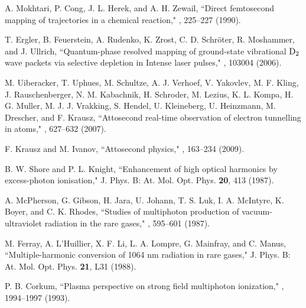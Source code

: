 \documentclass[10pt,letterpaper]{article}
\begin{document}

\begin{thebibliography}{99}
A. Mokhtari, P. Cong, J. L. Herek, and A. H. Zewail, ``Direct femtosecond mapping of trajectories in a chemical reaction," , 225--227 (1990).

T. Ergler, B. Feuerstein, A. Rudenko, K. Zrost, C. D. Schröter, R. Moshammer, and J. Ullrich, ``Quantum-phase resolved mapping of ground-state vibrational ${\rm{D}}_{2}$ wave packets via selective depletion in Intense laser pulses," , 103004 (2006).

M. Uiberacker, T. Uphues, M. Schultze, A. J. Verhoef, V. Yakovlev, M. F. Kling, J. Rauschenberger, N. M. Kabachnik, H. Schroder, M. Lezius, K. L. Kompa, H. G. Muller, M. J. J. Vrakking, S. Hendel, U. Kleineberg, U. Heinzmann, M. Drescher, and F. Krausz, ``Attosecond real-time observation of electron tunnelling in atoms," , 627--632 (2007).

F. Krausz and M. Ivanov, ``Attosecond physics," , 163--234 (2009).

B. W. Shore and P. L. Knight, ``Enhancement of high optical harmonics by excess-photon ionisation," J. Phys. B: At. Mol. Opt. Phys. {\bf 20}, 413 (1987).

A. McPherson, G. Gibson, H. Jara, U. Johann, T. S. Luk, I. A. McIntyre, K. Boyer, and C. K. Rhodes, ``Studies of multiphoton production of vacuum-ultraviolet radiation in the rare gases," , 595--601 (1987).

M. Ferray, A. L'Huillier, X. F. Li, L. A. Lompre, G. Mainfray, and C. Manus, ``Multiple-harmonic conversion of 1064 nm radiation in rare gases," J. Phys. B: At. Mol. Opt. Phys. {\bf 21}, L31 (1988).

P. B. Corkum, ``Plasma perspective on strong field multiphoton ionization," , 1994--1997 (1993).


\end{thebibliography}
\end{document}
